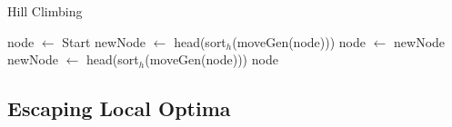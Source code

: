 \documentclass[a4paper]{article}
\begin{document}
\begin{itemize}
    \begin{algorithm}[H]
        \caption{Hill Climbing}\label{alg:AI-hill-climbing}
        \begin{algorithmic}[1]
            \State node $\gets$ Start
            \State newNode $\gets$ head(sort$_h$(moveGen(node)))
                \State node $\gets$ newNode
                \State newNode $\gets$ head(sort$_h$(moveGen(node)))
            \EndWhile
            \State \Return node
        \end{algorithmic}
    \end{algorithm}
\end{itemize}

\subsection{Escaping Local Optima}
\end{document}

